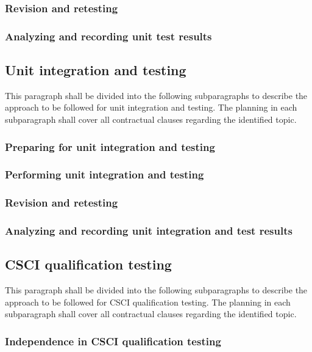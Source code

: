\documentclass{fidata-report-template}
\begin{document}
\subsubsection{Revision and retesting}

\subsubsection{Analyzing and recording unit test results}

\subsection{Unit integration and testing}

This paragraph shall be divided into the following subparagraphs to
describe the approach to be followed for unit integration and testing.
The planning in each subparagraph shall cover all contractual clauses
regarding the identified topic.

\subsubsection{Preparing for unit integration and testing}

\subsubsection{Performing unit integration and testing}

\subsubsection{Revision and retesting}

\subsubsection{Analyzing and recording unit integration and test
results}

\subsection{CSCI qualification testing}

This paragraph shall be divided into the following subparagraphs to
describe the approach to be followed for CSCI qualification testing. The
planning in each subparagraph shall cover all contractual clauses
regarding the identified topic.

\subsubsection{Independence in CSCI qualification testing}
\end{document}
